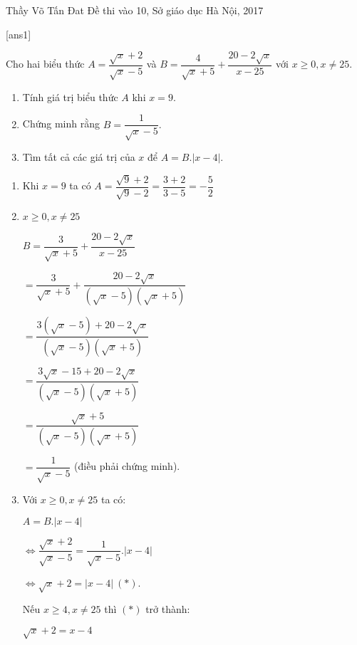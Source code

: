 \begin{name}
{Thầy  Võ Tấn Đat}
{Đề thi vào 10, Sở giáo dục Hà Nội, 2017}
\end{name}
\setcounter{ex}{0}
[ans1]
\begin{ex}%
	Cho hai biểu thức $A=\dfrac{\sqrt{x}+2}{\sqrt{x}-5}$ và $B=\dfrac{4}{\sqrt{x}+5}+\dfrac{20-2\sqrt{x}}{x-25}$ với $x \ge 0 , x \neq 25$.
    \hfill
    \begin{enumerate}
        \item Tính giá trị biểu thức $A$ khi $x=9$.
        \item Chứng minh rằng $B=\dfrac{1}{\sqrt{x}-5}.$
        \item Tìm tất cả các giá trị của $x$ để $A=B.|x-4|$.
    \end{enumerate}
\loigiai
    {
    \begin{enumerate}
        \item Khi $x=9$ ta có $A=\dfrac{\sqrt{9}+2}{\sqrt{9}-2}=\dfrac{3+2}{3-5}=-\dfrac{5}{2}$ 
         \item
         
           $ x \geq 0 , x \neq 25 $   
          
          $B=\dfrac{3}{\sqrt{x}+5}+\dfrac{20-2\sqrt{x}}{x-25}$
          
          $=\dfrac{3}{\sqrt{x}+5}+\dfrac{20-2\sqrt{x}}{(\sqrt{x}-5)(\sqrt{x}+5)}$ 
          
          $=\dfrac{3(\sqrt{x}-5)+20-2\sqrt{x}}{(\sqrt{x}-5)(\sqrt{x}+5)}$
          
          $= \dfrac{3\sqrt{x}-15+20-2\sqrt{x}}{(\sqrt{x}-5)(\sqrt{x}+5)}$
         
         $=\dfrac{\sqrt{x}+5}{(\sqrt{x}-5)(\sqrt{x}+5)}$
         
         $=\dfrac{1}{\sqrt{x}-5}$ (điều phải chứng minh).
         \item {Với} $ x \geq 0 , x \neq 25 $ ta có: 
         
         $A=B.|x-4|$
         
         $\Leftrightarrow \dfrac{\sqrt{x}+2}{\sqrt{x}-5}=\dfrac{1}{\sqrt{x}-5}.|x-4|$
         
         $\Leftrightarrow \sqrt{x}+2=|x-4| \ (*)$. 
         
         Nếu $x \ge 4, x\neq 25$ thì $(*)$ trở thành: 
         
         $\sqrt{x}+2=x-4$
         

\end{enumerate}}
\end{ex}
